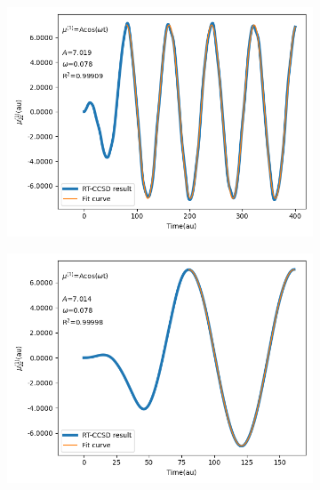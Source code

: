 \begin{figure}
\begin{subfigure}{0.47\textwidth}
         \includegraphics[width=\textwidth]{ch4/Figs/3-2.png}
     \end{subfigure}
     \hfill
     \begin{subfigure}{0.47\textwidth}
         \centering
         \includegraphics[width=\textwidth]{ch4/Figs/3-5.png}
     \end{subfigure}
     \vfill
     \begin{subfigure}{0.47\textwidth}
         \centering

\end{subfigure}
\end{figure}
